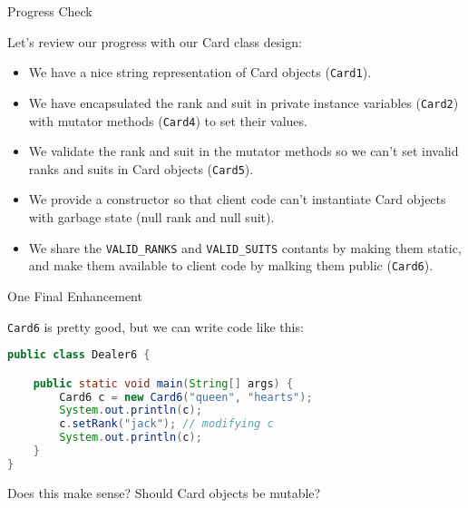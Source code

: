 \documentclass{beamer}
\begin{document}
\begin{frame}[fragile]{Progress Check}


Let's review our progress with our Card class design:
\begin{itemize}
\item We have a nice string representation of Card objects ({\tt Card1}).
\item We have encapsulated the rank and suit in private instance variables ({\tt Card2}) with mutator methods ({\tt Card4}) to set their values.
\item We validate the rank and suit in the mutator methods so we can't set invalid ranks and suits in Card objects ({\tt Card5}).
\item We provide a constructor so that client code can't instantiate Card objects with garbage state (null rank and null suit).
\item We share the {\tt VALID\_RANKS} and {\tt VALID\_SUITS} contants by making them static, and make them available to client code by malking them public ({\tt Card6}).
\end{itemize}


\end{frame}

\begin{frame}[fragile]{One Final Enhancement}

{\tt Card6} is pretty good, but we can write code like this:

\begin{lstlisting}[language=Java]
public class Dealer6 {

    public static void main(String[] args) {
        Card6 c = new Card6("queen", "hearts");
        System.out.println(c);
        c.setRank("jack"); // modifying c
        System.out.println(c);
    }
}
\end{lstlisting}
Does this make sense?  Should Card objects be mutable?

\end{frame}
\end{document}
